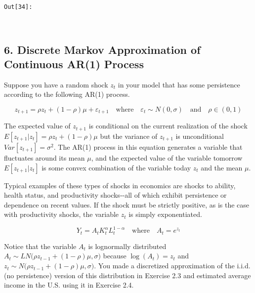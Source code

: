 \documentclass[11pt]{article}
\begin{document}
\texttt{\color{outcolor}Out[{\color{outcolor}34}]:}
    
    \begin{center}
    \end{center}
    { \hspace*{\fill} \\}
    

    \subsection{6. Discrete Markov Approximation of Continuous AR(1)
Process}\label{discrete-markov-approximation-of-continuous-ar1-process}

Suppose you have a random shock \(z_t\) in your model that has some
persistence according to the following AR(1) process.

\begin{equation}\label{NumInt_EqAR1}
  z_{t+1} = \rho z_{t} + (1-\rho)\mu + \varepsilon_{t+1} \quad\text{where}\quad \varepsilon_t\sim N(0,\sigma) \quad\text{and}\quad \rho\in(0,1)
\end{equation}

The expected value of \(z_{t+1}\) is conditional on the current
realization of the shock \(E[z_{t+1}|z_t] = \rho z_{t} + (1-\rho)\mu\)
but the variance of \(z_{t+1}\) is unconditional
\(Var[z_{t+1}] = \sigma^2\). The AR(1) process in this equation
generates a variable that fluctuates around its mean \(\mu\), and the
expected value of the variable tomorrow \(E[z_{t+1}|z_t]\) is some
convex combination of the variable today \(z_t\) and the mean \(\mu\).

Typical examples of these types of shocks in economics are shocks to
ability, health status, and productivity shocks-\/-all of which exhibit
persistence or dependence on recent values. If the shock must be
strictly positive, as is the case with productivity shocks, the variable
\(z_t\) is simply exponentiated.

\begin{equation}\label{NumInt_EqStochProd}
  Y_t = A_t K_t^\alpha L_t^{1-\alpha} \quad\text{where}\quad A_t = e^{z_t}
\end{equation}

Notice that the variable \(A_t\) is lognormally distributed
\(A_t\sim LN\bigl(\rho z_{t-1} + (1-\rho)\mu,\sigma\bigr)\) because
\(\log(A_t)=z_t\) and
\(z_t\sim N\bigl(\rho z_{t-1} + (1-\rho)\mu,\sigma\bigr)\). You made a
discretized approximation of the i.i.d. (no persistence) version of this
distribution in Exercise 2.3 and estimated average income in the U.S.
using it in Exercise 2.4.
\end{document}

